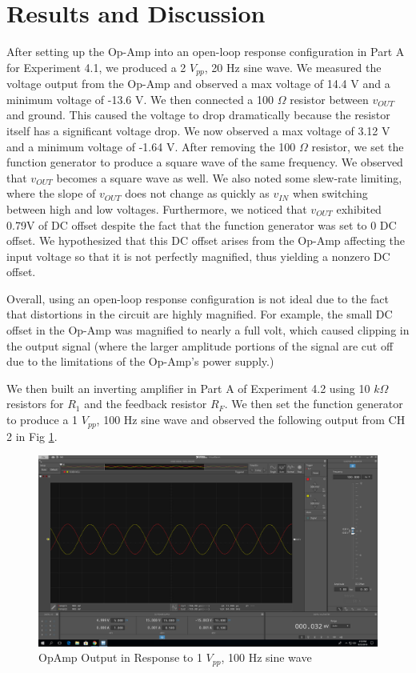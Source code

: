 \documentclass[10pt]{article}
\begin{document}
\section{Results and Discussion}

\qquad After setting up the Op-Amp into an open-loop response configuration in Part A for Experiment 4.1, we produced a 2 $V_{pp}$, 20 Hz sine wave. We measured the voltage output from the Op-Amp and observed a max voltage of 14.4 V and a minimum voltage of -13.6 V. We then connected a 100 $\Omega$ resistor between $v_{OUT}$ and ground. This caused the voltage to drop dramatically because the resistor itself has a significant voltage drop. We now observed a max voltage of 3.12 V and a minimum voltage of -1.64 V. After removing the 100 $\Omega$ resistor, we set the function generator to produce a square wave of the same frequency. We observed that $v_{OUT}$ becomes a square wave as well. We also noted some slew-rate limiting, where the slope of $v_{OUT}$ does not change as quickly as $v_{IN}$ when switching between high and low voltages. Furthermore, we noticed that $v_{OUT}$ exhibited 0.79V of DC offset despite the fact that the function generator was set to 0 DC offset. We hypothesized that this DC offset arises from the Op-Amp affecting the input voltage so that it is not perfectly magnified, thus yielding a nonzero DC offset. 

\quad Overall, using an open-loop response configuration is not ideal due to the fact that distortions in the circuit are highly magnified. For example, the small DC offset in the Op-Amp was magnified to nearly a full volt, which caused clipping in the output signal (where the larger amplitude portions of the signal are cut off due to the limitations of the Op-Amp's power supply.)

\quad We then built an inverting amplifier in Part A of Experiment 4.2 using 10 $k\Omega$ resistors for $R_1$ and the feedback resistor $R_F$. We then set the function generator to produce a 1 $V_{pp}$, 100 Hz sine wave and observed the following output from CH 2 in Fig \ref{fig:invertingamp}. 

\begin{centering}
	\begin{figure} [H]
		\centering
		\includegraphics[scale=0.22]{images/invertingamplifier.png}
		\caption{OpAmp Output in Response to 1 $V_{pp}$, 100 Hz sine wave}				
		\label{fig:invertingamp}
	\end{figure}
\end{centering}
\end{document}
